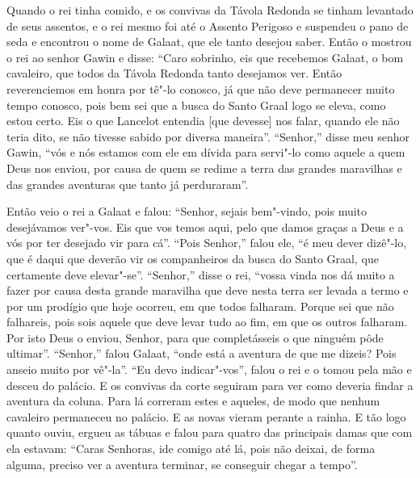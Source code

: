 Quando o rei tinha comido, e os convivas da Távola Redonda se tinham levantado
de seus assentos, e o rei mesmo foi até o Assento Perigoso e suspendeu o pano
de seda e encontrou o nome de Galaat, que ele tanto desejou saber. Então o
mostrou o rei ao senhor Gawin e disse: “Caro sobrinho, eis que recebemos
Galaat, o bom cavaleiro, que todos da Távola Redonda tanto desejamos ver.
Então reverenciemos em honra por tê"-lo conosco, já que não deve permanecer
muito tempo conosco, pois bem sei que a busca do Santo Graal logo se eleva,
como estou certo. Eis o que Lancelot entendia [que devesse] nos falar, quando ele não teria
dito, se não tivesse sabido por diversa maneira”. “Senhor,” disse meu senhor
Gawin, “vós e nós estamos com ele em dívida para servi"-lo como aquele a quem
Deus nos enviou, por causa de quem se redime a terra das grandes maravilhas e
das grandes aventuras que tanto já perduraram”. 

Então veio o rei a Galaat e falou: “Senhor, sejais bem"-vindo, pois muito
desejávamos ver"-vos. Eis que vos temos aqui, pelo que damos graças a Deus e a
vós por ter desejado vir para cá”. “Pois Senhor,” falou ele, “é meu dever
dizê"-lo, que é daqui que deverão vir os companheiros da busca do Santo Graal,
que certamente deve elevar"-se”. “Senhor,” disse o rei, “vossa vinda nos dá
muito a fazer por causa desta grande maravilha que deve nesta terra ser levada
a termo e por um prodígio que hoje ocorreu, em que todos falharam. Porque sei
que não falhareis, pois sois aquele que deve levar tudo ao fim, em que os
outros falharam. Por isto Deus o enviou, Senhor, para que completásseis o que
ninguém pôde ultimar”. “Senhor,” falou Galaat, “onde está a aventura de que me
dizeis? Pois anseio muito por vê"-la”. “Eu devo indicar"-vos”, falou o rei e o
tomou pela mão e desceu do palácio. E os convivas da corte seguiram para ver
como deveria findar a aventura da coluna. Para lá correram estes e aqueles, de
modo que nenhum cavaleiro permaneceu no palácio. E as novas vieram perante a
rainha. E tão logo quanto ouviu, ergueu as tábuas e falou para quatro das
principais damas que com ela estavam: “Caras Senhoras, ide comigo até lá, pois
não deixai, de forma alguma, preciso ver a aventura terminar, se conseguir
chegar a tempo”. 

